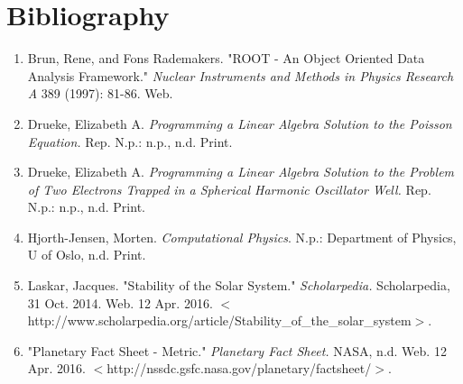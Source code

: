 \documentclass[12pt]{article}
\numberwithin{equation}{section}
\begin{document}
\section{Bibliography}
\label{sec:bib}

\begin{enumerate}

\item Brun, Rene, and Fons Rademakers. "ROOT - An Object Oriented Data Analysis Framework." \textit{Nuclear Instruments and Methods in Physics Research A} 389 (1997): 81-86. Web.
\item Drueke, Elizabeth A. \textit{Programming a Linear Algebra Solution to the Poisson Equation.} Rep. N.p.: n.p., n.d. Print.
\item Drueke, Elizabeth A. \textit{Programming a Linear Algebra Solution to the Problem of Two Electrons Trapped in a Spherical Harmonic Oscillator Well.} Rep. N.p.: n.p., n.d. Print.
\item Hjorth-Jensen, Morten. \textit{Computational Physics}. N.p.: Department of Physics, U of Oslo, n.d. Print.
\item Laskar, Jacques. "Stability of the Solar System." \textit{Scholarpedia.} Scholarpedia, 31 Oct. 2014. Web. 12 Apr. 2016. $<$http://www.scholarpedia.org/article/Stability\_of\_the\_solar\_system$>$.
\item "Planetary Fact Sheet - Metric." \textit{Planetary Fact Sheet.} NASA, n.d. Web. 12 Apr. 2016. $<$http://nssdc.gsfc.nasa.gov/planetary/factsheet/$>$.

\end{enumerate}
\end{document}
